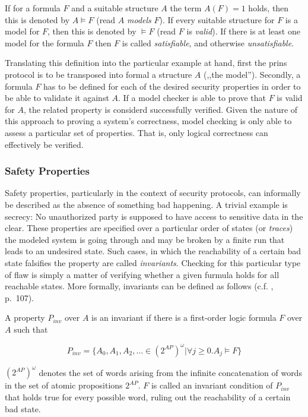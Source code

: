 If for a formula $F$ and a suitable structure $A$ the term $A(F) = 1$ holds, then this is denoted by $A \models F$ (read $A$ \textit{models} $F$).
If every suitable structure for $F$ is a model for $F$, then this is denoted by $\models F$ (read $F$ is \textit{valid}).
If there is at least one model for the formula $F$ then $F$ is called \textit{satisfiable}, and otherwise \textit{unsatisfiable}.

Translating this definition into the particular example at hand, first the \gls{prins} protocol is to be transposed into formal a structure $A$ (,,the model'').
Secondly, a formula $F$ has to be defined for each of the desired security properties in order to be able to validate it against $A$.
If a model checker is able to prove that $F$ is valid for $A$, the related property is considerd successfully verified.
Given the nature of this approach to proving a system's correctness, model checking is only able to assess a particular set of properties.
That is, only logical correctness can effectively be verified.

\subsubsection{Safety Properties}

Safety properties, particularly in the context of security protocols, can informally be described as the absence of something bad happening.
A trivial example is secrecy: No unauthorized party is supposed to have access to sensitive data in the clear.
These properties are specified over a particular order of states (or \textit{traces}) the modeled system is going through and may be broken by a finite run that leads to an undesired state.
Such cases, in which the reachability of a certain bad state falsifies the property are called \textit{invariants}.
Checking for this particular type of flaw is simply a matter of verifying whether a given furmula holds for all reachable states.
More formally, invariants can be defined as follows (c.f. \cite{baier2008principles}, p.~107).

A property $P_{inv}$ over $A$ is an invariant if there is a first-order logic formula $F$ over $A$ such that

\begin{equation*}
    P_{inv} = \{ A_0, A_1, A_2, \ldots \in (2^{AP})^\omega | \forall j \geq 0. A_j \models F \}
\end{equation*}

\noindent
$(2^{AP})^\omega$ denotes the set of words arising from the infinite concatenation of words in the set of atomic propositions $2^{AP}$.
$F$ is called an invariant condition of $P_{inv}$ that holds true for every possible word, ruling out the reachability of a certain bad state.

